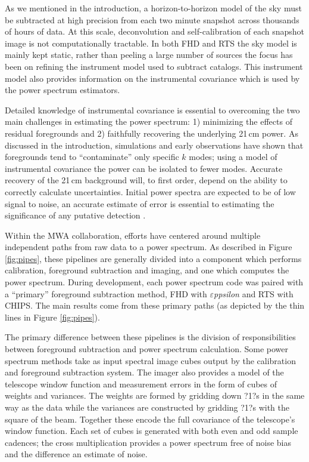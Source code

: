 \documentclass[twolcolumn,iop]{emulateapj}
\def\eppsilon{{\it $\varepsilon$ppsilon}}
\begin{document}
As we mentioned in the introduction, a horizon-to-horizon model of the sky must be subtracted at high precision from each two minute snapshot across thousands of hours of data. At this scale, deconvolution and self-calibration of each snapshot image is not computationally tractable.  In both FHD and RTS the sky model is mainly kept static, rather than peeling a large number of sources the focus has been on refining the instrument model used to subtract catalogs.  This instrument model also provides information on the instrumental covariance which is used by the power spectrum estimators.


Detailed knowledge of instrumental covariance is essential to overcoming the two main challenges in estimating the power spectrum: 1) minimizing the effects of residual foregrounds and 2) faithfully recovering the underlying 21\,cm power.   As discussed in the introduction, simulations and early observations have shown that foregrounds tend to ``contaminate'' only specific $k$ modes; using a model of instrumental covariance the power can be isolated to fewer modes.  Accurate recovery of the 21\,cm background will, to first order, depend on the ability to correctly calculate uncertainties.  Initial power spectra are expected to be of low signal to noise, an accurate estimate of error is essential to estimating the significance of any putative detection \citep{Pober:2014p10390,Beardsley:2013p9952}. 


  Within the MWA collaboration, efforts have centered around multiple independent paths from raw data to a power spectrum.  As described in Figure \ref{fig:pipes}, these pipelines are generally divided into a component which performs calibration, foreground subtraction and imaging, and one which computes the power spectrum.  During development, each power spectrum code was paired with a ``primary'' foreground subtraction method, FHD with \eppsilon{} and RTS with CHIPS.   The main results come from these primary paths (as depicted by the thin lines in Figure \ref{fig:pipes}). 

The primary difference between these pipelines is the division of responsibilities between foreground subtraction and power spectrum calculation. Some power spectrum methods take as input spectral image cubes output by the calibration and foreground subtraction system.  The imager also provides a model of the telescope window function and measurement errors in the form of cubes of weights and variances. The weights are formed by gridding down ?1?s in the same way as the data while the variances are constructed by gridding ?1?s with the square of the beam. Together these encode the full covariance of the telescope's window function.  Each set of cubes is generated with both even and odd sample cadences; the cross multiplication provides a power spectrum free of noise bias and the difference an estimate of noise.
\end{document}
